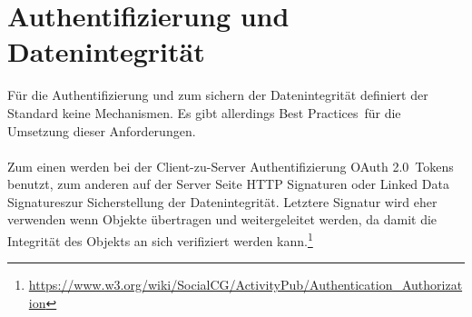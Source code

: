 \section{Authentifizierung und Datenintegrität}
	Für die Authentifizierung und zum sichern der Datenintegrität definiert der Standard keine Mechanismen. Es gibt allerdings \glqq Best Practices\grqq~für die Umsetzung dieser Anforderungen.
	\\\\Zum einen werden bei der Client-zu-Server Authentifizierung \glqq OAuth 2.0\grqq~Tokens benutzt, zum anderen auf der Server Seite HTTP Signaturen oder \glqq Linked Data Signatures\grqq zur Sicherstellung der Datenintegrität. Letztere Signatur wird eher verwenden wenn Objekte übertragen und weitergeleitet werden, da damit die Integrität des Objekts an sich verifiziert werden kann.\footnote{\url{https://www.w3.org/wiki/SocialCG/ActivityPub/Authentication_Authorization}}
